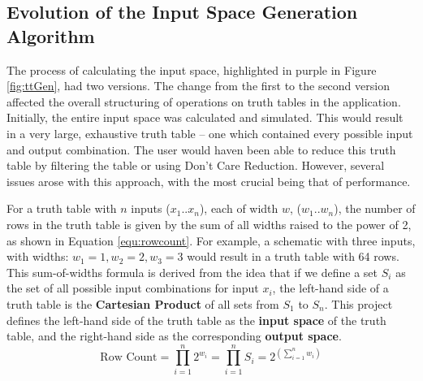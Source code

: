 
\subsection{Evolution of the Input Space Generation Algorithm} \label{subsec:evolutionofinputspace}
The process of calculating the input space, highlighted in purple in Figure \ref{fig:ttGen}, had two versions. The change from the first to the second version affected the overall structuring of operations on truth tables in the application. Initially, the entire input space was calculated and simulated. This would result in a very large, exhaustive truth table -- one which contained every possible input and output combination. The user would haven been able to reduce this truth table by filtering the table or using Don't Care Reduction. However, several issues arose with this approach, with the most crucial being that of performance. 

For a truth table with $n$ inputs ($x_1 .. x_n$), each of width $w$, ($w_1 .. w_n$), the number of rows in the truth table is given by the sum of all widths raised to the power of 2, as shown in Equation \ref{equ:rowcount}. For example, a schematic with three inputs, with widths: $w_1 = 1, w_2 = 2, w_3 = 3$ would result in a truth table with 64 rows. This sum-of-widths formula is derived from the idea that if we define a set $S_i$ as the set of all possible input combinations for input $x_i$, the left-hand side of a truth table is the \textbf{Cartesian Product} of all sets from $S_1$ to $S_n$. This project defines the left-hand side of the truth table as the \textbf{input space} of the truth table, and the right-hand side as the corresponding \textbf{output space}.
\begin{equation} \label{equ:rowcount}
    \textrm{Row Count} = \prod_{i=1}^{n} 2^{w_i} = \prod_{i=1}^{n} S_i = 2^ {\left( \sum_{i=1}^{n} w_i \right)}
\end{equation}

